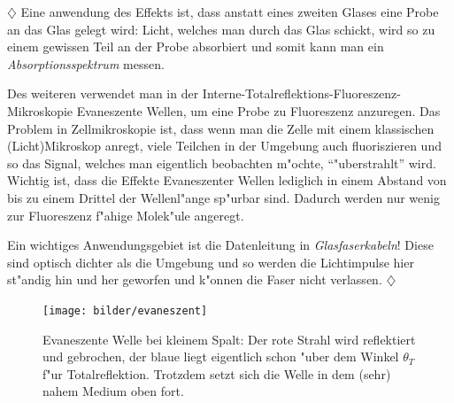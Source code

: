 \documentclass[twoside,a4paper]{book}
\newenvironment*{Beispiel}[0]{$\diamondsuit$\sffamily}{ \hfill $\diamondsuit$}
\begin{document}
\begin{Beispiel}
   Eine anwendung des Effekts ist, dass anstatt eines zweiten Glases
   eine Probe an das Glas gelegt wird: Licht, welches man durch das
   Glas schickt, wird so zu einem gewissen Teil an der Probe
   absorbiert und somit kann man ein \emph{Absorptionsspektrum}
   messen.

   Des weiteren verwendet man in der
   Interne-Totalreflektions-Fluoreszenz-Mikroskopie Evaneszente
   Wellen, um eine Probe zu Fluoreszenz anzuregen. Das Problem in
   Zellmikroskopie ist, dass wenn man die Zelle mit einem klassischen
   (Licht)Mikroskop anregt, viele Teilchen in der Umgebung auch
   fluoriszieren und so das Signal, welches man eigentlich beobachten
   m"ochte, "`"uberstrahlt"' wird. 
   Wichtig ist, dass die Effekte Evaneszenter Wellen 
   lediglich in einem Abstand von bis zu einem Drittel der
   Wellenl"ange sp"urbar sind. Dadurch werden nur wenig zur
   Fluoreszenz f"ahige Molek"ule angeregt.

   Ein wichtiges Anwendungsgebiet ist die Datenleitung in
   \emph{Glasfaserkabeln}! Diese sind optisch dichter als die Umgebung
   und so werden die Lichtimpulse hier st"andig hin und her geworfen
   und k"onnen die Faser nicht verlassen.
\end{Beispiel}



\begin{figure}
   \centering
   \texttt{[image: bilder/evaneszent]}
   \caption[Evaneszente Welle bei kleinem Spalt]{Evaneszente Welle bei
     kleinem Spalt: Der rote Strahl wird reflektiert und gebrochen,
     der blaue liegt eigentlich schon "uber dem Winkel $\theta_T$ f"ur
     Totalreflektion. Trotzdem setzt sich die Welle in dem (sehr)
     nahem Medium oben fort.}
   \label{abb_evaneszent}
\end{figure}


\end{document}
